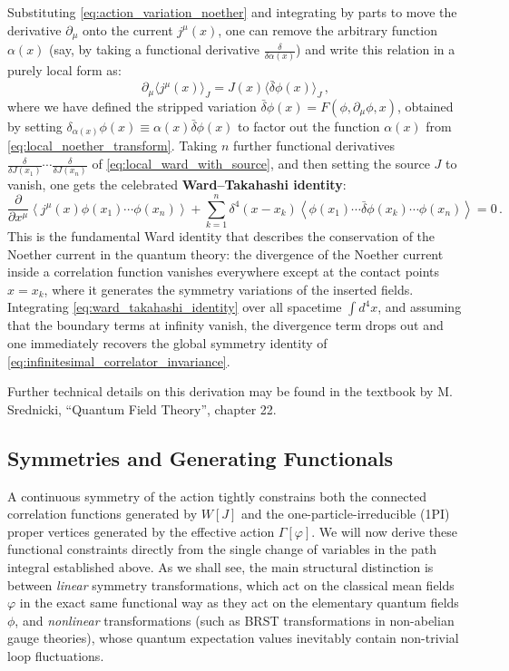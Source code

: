 Substituting \eqref{eq:action_variation_noether} and integrating by parts to move the derivative \(\partial_\mu\) onto the current \(j^\mu(x)\), one can remove the arbitrary function \(\alpha(x)\) (say, by taking a functional derivative \(\frac{\delta}{\delta \alpha(x)}\)) and write this relation in a purely local form as:
\begin{equation} \label{eq:local_ward_with_source}
    \partial_\mu \langle j^\mu(x) \rangle_J = J(x) \langle \bar{\delta}\phi(x) \rangle_J \, ,
\end{equation}
where we have defined the stripped variation \(\bar{\delta}\phi(x) = F(\phi, \partial_\mu\phi, x)\), obtained by setting \(\delta_{\alpha(x)}\phi(x) \equiv \alpha(x)\bar{\delta}\phi(x)\) to factor out the function \(\alpha(x)\) from \eqref{eq:local_noether_transform}. Taking \(n\) further functional derivatives \(\frac{\delta}{\delta J(x_1)} \cdots \frac{\delta}{\delta J(x_n)}\) of \eqref{eq:local_ward_with_source}, and then setting the source \(J\) to vanish, one gets the celebrated \textbf{Ward--Takahashi identity}:
\begin{equation} \label{eq:ward_takahashi_identity}
    \boxed{\frac{\partial}{\partial x^\mu} \left\langle j^\mu(x) \phi(x_1) \cdots \phi(x_n) \right\rangle + \sum_{k=1}^n \delta^4(x - x_k) \left\langle \phi(x_1) \cdots \bar{\delta}\phi(x_k) \cdots \phi(x_n) \right\rangle = 0} \, .
\end{equation}
This is the fundamental Ward identity that describes the conservation of the Noether current in the quantum theory: the divergence of the Noether current inside a correlation function vanishes everywhere except at the contact points \(x = x_k\), where it generates the symmetry variations of the inserted fields. Integrating \eqref{eq:ward_takahashi_identity} over all spacetime \(\int d^4x\), and assuming that the boundary terms at infinity vanish, the divergence term drops out and one immediately recovers the global symmetry identity of \eqref{eq:infinitesimal_correlator_invariance}.

Further technical details on this derivation may be found in the textbook by M. Srednicki, ``Quantum Field Theory'', chapter 22.

\subsection{Symmetries and Generating Functionals}

A continuous symmetry of the action tightly constrains both the connected correlation functions generated by \(W[J]\) and the one-particle-irreducible (1PI) proper vertices generated by the effective action \(\Gamma[\varphi]\). We will now derive these functional constraints directly from the single change of variables in the path integral established above. As we shall see, the main structural distinction is between \textit{linear} symmetry transformations, which act on the classical mean fields \(\varphi\) in the exact same functional way as they act on the elementary quantum fields \(\phi\), and \textit{nonlinear} transformations (such as BRST transformations in non-abelian gauge theories), whose quantum expectation values inevitably contain non-trivial loop fluctuations.

